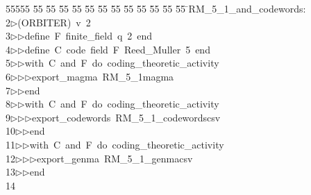 %
%
\begin{tabbing}
55555 \= 55 \= 55 \= 55 \= 55 \= 55 \= 55 \= 55 \= 55 \= 55 \= 55 \= 55 \= 55 \= \>RM\_5\_1\_and\_codewords:\\[0pt]
2\>$\triangleright$\>(ORBITER)\ v\ 2\ \\[0pt]
3\>$\triangleright$\>$\triangleright$\>define\ F\ finite\_field\ q\ 2\ end\ \\[0pt]
4\>$\triangleright$\>$\triangleright$\>define\ C\ code\ field\ F\ Reed\_Muller\ 5\ end\ \\[0pt]
5\>$\triangleright$\>$\triangleright$\>with\ C\ and\ F\ do\ coding\_theoretic\_activity\ \\[0pt]
6\>$\triangleright$\>$\triangleright$\>$\triangleright$\>export\_magma\ RM\_5\_1magma\ \\[0pt]
7\>$\triangleright$\>$\triangleright$\>end\ \\[0pt]
8\>$\triangleright$\>$\triangleright$\>with\ C\ and\ F\ do\ coding\_theoretic\_activity\ \\[0pt]
9\>$\triangleright$\>$\triangleright$\>$\triangleright$\>export\_codewords\ RM\_5\_1\_codewordscsv\ \\[0pt]
10\>$\triangleright$\>$\triangleright$\>end\ \\[0pt]
11\>$\triangleright$\>$\triangleright$\>with\ C\ and\ F\ do\ coding\_theoretic\_activity\ \\[0pt]
12\>$\triangleright$\>$\triangleright$\>$\triangleright$\>export\_genma\ RM\_5\_1\_genmacsv\ \\[0pt]
13\>$\triangleright$\>$\triangleright$\>end\ \\[0pt]
14\>\end{tabbing}
